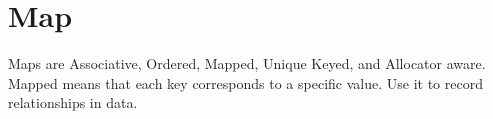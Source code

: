 \section{Map}
Maps are Associative, Ordered, Mapped, Unique Keyed, and Allocator aware\cite{cplusplus}.  Mapped means that each key corresponds to a specific value. Use it to record relationships in data.
